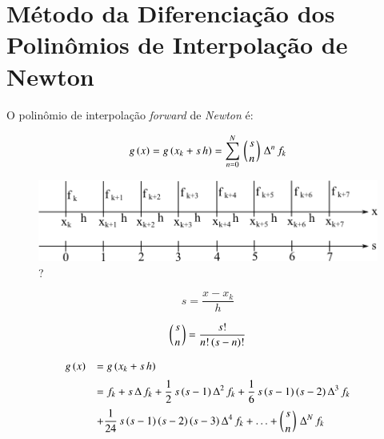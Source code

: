 \section{Método da Diferenciação dos Polinômios de Interpolação de Newton}

\begin{enumerar}

\item O polinômio de interpolação \textit{forward} de \textit{Newton} é:

\begin{equation}
 \label{cap3:sec3:eq1}
 g\,(x) = g\,(x_k + s\,h) = \sum_{n=0}^N \, \left(s \atop n\right) \, \Delta^n \, f_k
\end{equation}

\begin{figure}[htb]
 \centering
 \includegraphics[scale=1.0]{capitulos/capitulo3/figuras/met_dif_pol_int_new1.png}
 \caption{?}
 \label{fig:met_dif_pol_int_new1}
\end{figure}

\begin{equation}
 \label{cap3:sec3:eq2}
 s = \frac{x - x_k}{h}
\end{equation}

\begin{equation}
 \label{cap3:sec3:eq3}
 \left(s \atop n\right) = \frac{s!}{n!\,(s-n)!}
\end{equation}

\begin{equation}
 \label{cap3:sec3:eq4}
 \begin{array}{ll}
  g\,(x) & = g\,(x_k + s\,h) \vspace*{0.2cm} \\
         & = f_k + s\,\Delta\,f_k + \displaystyle \frac{1}{2} \, s\,(s-1)\,\Delta^2\,f_k + \frac{1}{6} \, s\,(s-1)\,(s-2)\,\Delta^3\,f_k \vspace*{0.2cm} \\
         & + \displaystyle \frac{1}{24}\,s\,(s-1)\,(s-2)\,(s-3)\,\Delta^4\,f_k + \ldots + \left(s \atop n\right) \, \Delta^N \, f_k
 \end{array}
\end{equation}


\end{enumerar}
